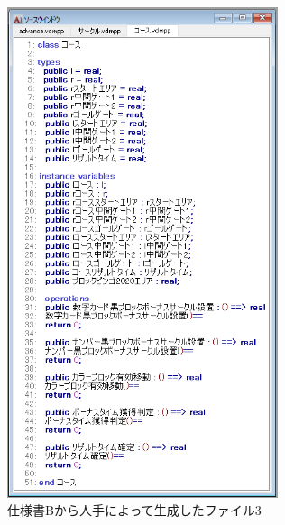 \begin{figure}[tp]
    \begin{center}
    \includegraphics[width=300]{image/speB_vdm3.PNG}
    \caption{仕様書Bから人手によって生成したファイル3}
    \label{fig:speB_vdm3}
    \end{center}
\end{figure}

